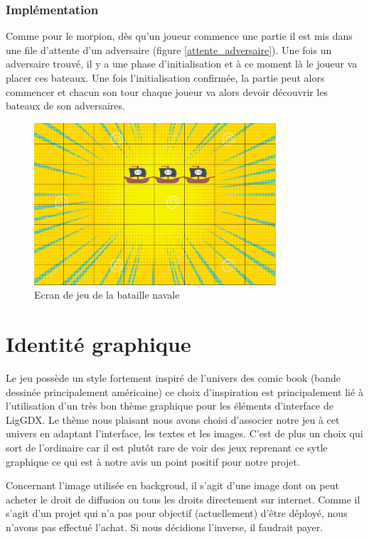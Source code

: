 \documentclass{report}
\begin{document}
\subsection{Implémentation}
Comme pour le morpion, dès qu'un joueur commence une partie il est mis dans une file d'attente d'un adversaire (figure \ref{attente_adversaire}).
Une fois un adversaire trouvé, il y a une phase d'initialisation et à ce moment là le joueur va placer ces bateaux. Une fois l'initialisation confirmée,
la partie peut alors commencer et chacun son tour chaque joueur va alors devoir découvrir les bateaux de son adversaires.

\begin{figure}[H]
	\centering\includegraphics[width=9cm]{notreBataille}
	\caption{Ecran de jeu de la bataille navale}
	\label{notreBataille}
\end{figure}

\chapter{Identité graphique}
Le jeu possède un style fortement inspiré de l'univers des comic book (bande dessinée principalement américaine)
ce choix d'inspiration est principalement lié à l'utilisation d'un très bon thème graphique pour les éléments
d'interface de LigGDX. Le thème nous plaisant nous avons choisi d'associer notre jeu à cet univers en adaptant l'interface, les
textes et les images. C'est de plus un choix qui sort de l'ordinaire car il est plutôt rare de voir des jeux
reprenant ce sytle graphique ce qui est à notre avis un point positif pour notre projet.
\par
Concernant l'image utilisée en backgroud, il s'agit d'une image dont on peut acheter le droit de diffusion ou tous les droits directement sur internet. Comme il s'agit d'un projet qui n'a pas pour objectif (actuellement) d'être déployé, nous n'avons pas effectué l'achat. Si nous décidions l'inverse, il faudrait payer.
\end{document}
